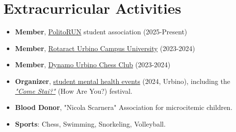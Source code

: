 \section{Extracurricular Activities}
{\small
\begin{itemize}
    \item \textbf{Member}, \href{https://www.runpolito.it/}{PolitoRUN} student association (2025-Present)
    \item \textbf{Member}, \href{https://www.rotarycluburbino.org/copia-di-rotaract-valle-del-metauro}{Rotaract Urbino Campus University} (2023-2024)
    \item \textbf{Member}, \href{https://dynamourbino.jimdofree.com/}{Dynamo Urbino Chess Club} (2023-2024)
    \item \textbf{Organizer}, \href{https://www.instagram.com/p/C7PJqpWsjQW/}{student mental health events} (2024, Urbino), including the \href{https://www.ansa.it/marche/notizie/universita_degli_studi_di_urbino_carlo_bo/2025/04/30/festival-come-stai-urbino-dedicato-alla-salute-mentale_3fab65f5-03af-48c4-89b0-6ff1c972bbc2.html}{\textit{"Come Stai?"}} (How Are You?) festival.
    \item \textbf{Blood Donor}, "Nicola Scarnera" Association for microcitemic children.
    \item \textbf{Sports}: Chess, Swimming, Snorkeling, Volleyball.
\end{itemize}
}